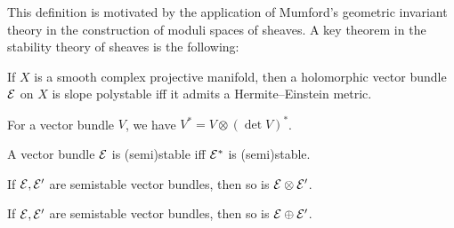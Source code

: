 This definition is motivated by the application of Mumford's geometric invariant
theory in the construction of moduli spaces of sheaves. A key theorem in the
stability theory of sheaves is the following:

\begin{theorem}
    If $X$ is a smooth complex projective manifold, then a holomorphic vector
    bundle $\mathcal{E}$ on $X$ is slope polystable iff it admits a Hermite--Einstein
    metric.
\end{theorem}

\begin{lemma}
    For a vector bundle $V$, we have $V^*=V\otimes(\det V)^*$.
\end{lemma}

\begin{proposition}
    A vector bundle $\mathcal{E}$ is (semi)stable iff $\mathcal{E}^*$ is (semi)stable.
\end{proposition}

\begin{proposition}
    If $\mathcal{E},\mathcal{E}'$ are semistable vector bundles, then so is
    $\mathcal{E}\otimes\mathcal{E}'$.
\end{proposition}

\begin{proposition}
    If $\mathcal{E},\mathcal{E}'$ are semistable vector bundles, then so is
    $\mathcal{E}\oplus\mathcal{E}'$.
\end{proposition}

